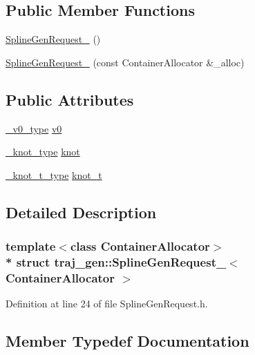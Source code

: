 \subsection*{Public Member Functions}
\begin{DoxyCompactItemize}
\item 
\hyperlink{structtraj__gen_1_1_spline_gen_request___ac49637db7812e53d860e47fc22fc353e}{Spline\+Gen\+Request\+\_\+} ()
\item 
\hyperlink{structtraj__gen_1_1_spline_gen_request___a8d93234a4a98d537fd0df95493530042}{Spline\+Gen\+Request\+\_\+} (const Container\+Allocator \&\+\_\+alloc)
\end{DoxyCompactItemize}
\subsection*{Public Attributes}
\begin{DoxyCompactItemize}
\item 
\hyperlink{structtraj__gen_1_1_spline_gen_request___ae09e79b3dca72bb90798d17eba2a467a}{\+\_\+v0\+\_\+type} \hyperlink{structtraj__gen_1_1_spline_gen_request___a8cf16aad9996e95f2327e72a39d6f07d}{v0}
\item 
\hyperlink{structtraj__gen_1_1_spline_gen_request___a24a664250b46a3a7327876929deac6c4}{\+\_\+knot\+\_\+type} \hyperlink{structtraj__gen_1_1_spline_gen_request___ab6ca79c8e920f25c09dc0b07ceceac4e}{knot}
\item 
\hyperlink{structtraj__gen_1_1_spline_gen_request___adb20ee842cb5f2dce6ad7994e5590b3f}{\+\_\+knot\+\_\+t\+\_\+type} \hyperlink{structtraj__gen_1_1_spline_gen_request___ae03991c8c3762e1dbd2f53be45f7f026}{knot\+\_\+t}
\end{DoxyCompactItemize}


\subsection{Detailed Description}
\subsubsection*{template$<$class Container\+Allocator$>$\\*
struct traj\+\_\+gen\+::\+Spline\+Gen\+Request\+\_\+$<$ Container\+Allocator $>$}



Definition at line 24 of file Spline\+Gen\+Request.\+h.



\subsection{Member Typedef Documentation}
